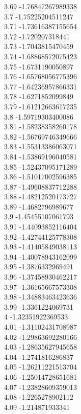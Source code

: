 {3.69	-1.76847267989338\\
3.7	-1.75225204511247\\
3.71	-1.73616387155654\\
3.72	-1.720207318441\\
3.73	-1.7043815470459\\
3.74	-1.68868572075423\\
3.75	-1.6731190050897\\
3.76	-1.65768056775396\\
3.77	-1.64236957866331\\
3.78	-1.6271852099849\\
3.79	-1.61212663617235\\
3.8	-1.59719303400086\\
3.81	-1.58238358260178\\
3.82	-1.56769746349666\\
3.83	-1.55313386063071\\
3.84	-1.53869196040581\\
3.85	-1.52437095171289\\
3.86	-1.51017002596385\\
3.87	-1.49608837712288\\
3.88	-1.48212520173727\\
3.89	-1.4682796989677\\
3.9	-1.45455107061793\\
3.91	-1.44093852116404\\
3.92	-1.42744125778308\\
3.93	-1.41405849038113\\
3.94	-1.40078943162099\\
3.95	-1.3876332969491\\
3.96	-1.37458930462217\\
3.97	-1.36165667573308\\
3.98	-1.34883463423636\\
3.99	-1.3361224069731\\
4	-1.32351922369533\\
4.01	-1.31102431708987\\
4.02	-1.29863692280166\\
4.03	-1.28635627945658\\
4.04	-1.2741816286837\\
4.05	-1.26211221513704\\
4.06	-1.25014728651681\\
4.07	-1.23828609359013\\
4.08	-1.2265278902112\\
4.09	-1.214871933341\\
}
